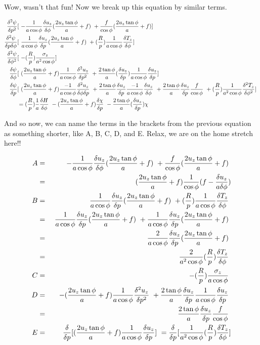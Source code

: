 \documentclass{article}
\begin{document}
Wow, wasn't that fun!  Now we break up this equation by similar terms.

\begin{eqnarray}
\frac{\delta^2 \psi}{\delta p^2} & [ \
- \frac{1}{a\cos{\phi}} \frac{\delta u_z}{\delta \phi} (\frac{2 u_z \tan \phi}{a} + f) \
+ \frac{f}{\cos \phi}(\frac{2 u_z \tan \phi}{a} + f) ] \
\nonumber\\
\frac{\delta^2 \psi}{\delta p \delta \phi} & [ \
\frac{1}{a\cos{\phi}} \frac{\delta u_z}{\delta p}  (\frac{2 u_z \tan \phi }{a} + f) \
+ (\frac{R}{p}) \frac{1}{a\cos{\phi}} \frac{\delta T_z}{\delta \phi} ] \
\nonumber\\
\frac{\delta^2 \psi}{\delta \phi^2} & [ \
- (\frac{R}{p}) \frac{\sigma_z}{a^2 \cos \phi} ] \
\nonumber\\
\frac{\delta \psi}{\delta \phi} & [ \
(\frac{2 u_z \tan \phi}{a} + f) \frac{1}{a\cos{\phi}} \frac{\delta^2 u_z}{\delta p^2} \
+ \frac{2 \tan \phi}{a} (\frac{\delta u_z}{\delta p}) \frac{1}{a\cos{\phi}} \frac{\delta u_z}{\delta p} ] \
\nonumber\\
\frac{\delta \psi}{\delta p} & [ \
(\frac{2 u_z \tan \phi}{a} + f) \frac{-1}{a \cos \phi} \frac{\delta^2 u_z}{\delta \phi \delta p} \
+ \frac{2 \tan \phi}{a} \frac{\delta u_z}{\delta p} \frac{-1}{a \cos \phi} \frac{\delta u_z}{\delta \phi} \
+ \frac{2 \tan \phi}{a} \frac{\delta u_z}{\delta p} \frac{f}{\cos \phi} \
+ (\frac{R}{p}) \frac{1}{a^2 \cos{\phi}} \frac{\delta^2 T_z}{\delta \phi^2} ] \
\nonumber\\
& = (\frac{R}{p}) \frac{1}{a} \frac{\delta H}{\delta \phi} \
- (\frac{2 u_z \tan \phi}{a} + f) \frac{\delta \chi}{\delta p} \
- \frac{2 \tan \phi}{a} (\frac{\delta u_z}{\delta p}) \chi
\end{eqnarray}

And so now, we can name the terms in the brackets from the previous equation
as something shorter,
like A, B, C, D, and E.  Relax, we are on the home stretch here!!

\begin{eqnarray}
A & = & \
- \frac{1}{a\cos{\phi}} \frac{\delta u_z}{\delta \phi} (\frac{2 u_z \tan \phi}{a} + f) \
+ \frac{f}{\cos \phi}(\frac{2 u_z \tan \phi}{a} + f) \
\nonumber\\
& = &(\frac{2 u_z \tan \phi}{a} + f) \frac{1}{\cos \phi} (f - \frac{\delta u_z}{a \delta \phi})
\\
B & = & \
\frac{1}{a\cos{\phi}} \frac{\delta u_z}{\delta p}  (\frac{2 u_z \tan \phi }{a} + f) \
+ (\frac{R}{p}) \frac{1}{a\cos{\phi}} \frac{\delta T_z}{\delta \phi} \
\nonumber\\
& = & \
\frac{1}{a\cos{\phi}} \frac{\delta u_z}{\delta p} (\frac{2 u_z \tan \phi }{a} + f) \
+ \frac{1}{a\cos{\phi}} \frac{\delta u_z}{\delta p} (\frac{2 u_z \tan \phi }{a} + f) \
\nonumber\\
& = &\
\frac{2}{a \cos \phi} \frac{\delta u_z}{\delta p} (\frac{2 u_z \tan \phi }{a} + f) \
\nonumber\\
& = &\
\frac{2}{a^2 \cos \phi} (\frac{R}{p}) \frac{\delta T_z}{\delta \phi} \
\\
C & = & - (\frac{R}{p}) \frac{\sigma_z}{a \cos \phi} \
\\
D & = & \
- (\frac{2 u_z \tan \phi}{a} + f) \frac{1}{a\cos{\phi}} \frac{\delta^2 u_z}{\delta p^2} \
+ \frac{2 \tan \phi}{a} \frac{\delta u_z}{\delta p} \frac{1}{a\cos{\phi}} \frac{\delta u_z}{\delta p} \
\nonumber\\
& = &\frac{2 \tan \phi}{a} \frac{\delta u_z}{\delta p} \frac{f}{\cos \phi} \
\\
E & = & \frac{\delta}{\delta p} [ (\frac{2 u_z \tan \phi}{a} + f) \frac{1}{a \cos \phi} \frac{\delta u_z}{\delta p} ] \
= \frac{\delta}{\delta p} [ \frac{1}{a^2 \cos{\phi}} (\frac{R}{p}) \frac{\delta T_z}{\delta \phi} ]
\end{eqnarray}
\end{document}
